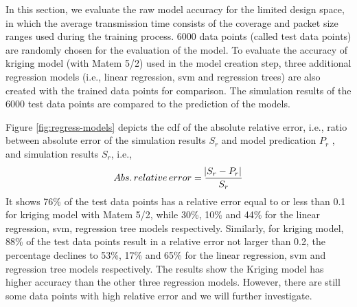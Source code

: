 In this section, we evaluate the \gls{raw} model accuracy for the limited design space, in which the average transmission time consists of the coverage and packet size ranges used during the training process. 
6000 data points (called test data points) are randomly chosen for the evaluation of the model. To evaluate the accuracy of kriging model (with Matem 5/2) used in the model creation step, three additional regression models (i.e., linear regression, \gls{svm} and regression trees) are also created with the trained data points for comparison. The simulation results of the 6000 test data points are compared to the prediction of the models. 



Figure \ref{fig:regress-models} depicts the \gls{cdf} of the absolute relative error, i.e., ratio between absolute error of the simulation results $S_r$ and model predication $P_r$ , and simulation results $S_r$, i.e., 
\begin{equation}
Abs. \thinspace relative \thinspace error = \frac{\abs{S_r - P_r} }{S_r} 
\end{equation}
It shows 76\% of the test data points has a relative error equal to or less than 0.1 for kriging model with Matem 5/2, while 30\%, 10\% and 44\% for the linear regression, \gls{svm}, regression tree models respectively. Similarly,  for kriging model, 88\% of the test data points result in  a relative error not larger than 0.2, the percentage declines to 53\%, 17\% and 65\% for the linear regression, \gls{svm} and regression tree models respectively. The results show the Kriging model has higher accuracy than the other three regression models. However, there are still some data points with high relative error and we will further investigate. 


